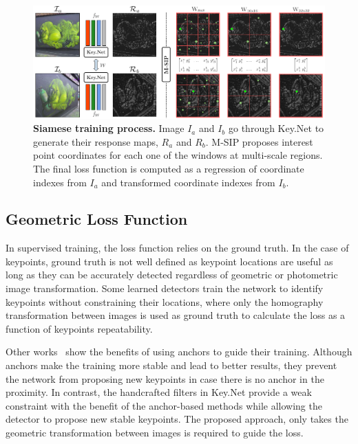 \begin{figure}[!htb]
    \centering
    \includegraphics[scale=0.4]{main/chapter02/figures/training_v2.pdf}
    \vspace{-0.20cm}
    \caption[Siamese training process]{\textbf{Siamese training process.} Image $I_a$ and $I_b$ go through Key.Net to generate their response maps, $R_a$ and $R_b$. M-SIP proposes interest point coordinates for each one of the windows at multi-scale regions. The final loss function is computed as a regression of coordinate indexes from $I_a$ and transformed coordinate indexes from $I_b$.}
    \label{keynet_fig:trainingfigure}
\end{figure}

\subsection{Geometric Loss Function}
\label{keynet_sec:loss_functions}

In supervised training, the loss function relies on the ground truth. In the case of keypoints, ground truth is not well defined as keypoint locations are useful as long as they can be accurately detected regardless of geometric or photometric image transformation. Some learned detectors \cite{Karel_Vedaldi_ECCV_16,savinov2016quad,OnoSerra18} train the network to identify keypoints without constraining their locations, where only the homography transformation between images is used as ground truth to calculate the loss as a function of keypoints repeatability. 

Other works~\cite{TILDE,detone2017superpoint,Zhang_Felix_CVPR_17} show the benefits of using anchors to guide their training. Although anchors make the training more stable and lead to better results, they prevent the network from proposing new keypoints in case there is no anchor in the proximity. In contrast, the handcrafted filters in Key.Net provide a weak constraint with the benefit of the anchor-based methods while allowing the detector to propose new stable keypoints. The proposed approach, only takes the geometric transformation between images is required to guide the loss.

